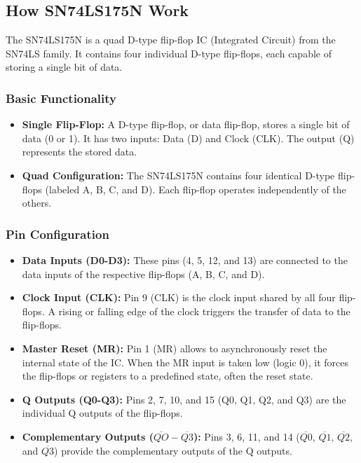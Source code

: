 \documentclass{article}
\begin{document}
\subsection{How SN74LS175N Work}
The SN74LS175N is a quad D-type flip-flop IC (Integrated Circuit) from the SN74LS family. It contains four individual D-type flip-flops, each capable of storing a single bit of data.\par

\subsubsection{Basic Functionality}\par
\begin{itemize}
    \item \textbf{Single Flip-Flop:} A D-type flip-flop, or data flip-flop, stores a single bit of data (0 or 1). It has two inputs: Data (D) and Clock (CLK). The output (Q) represents the stored data.
    \item \textbf{Quad Configuration:} The SN74LS175N contains four identical D-type flip-flops (labeled A, B, C, and D). Each flip-flop operates independently of the others.
\end{itemize}

\subsubsection{Pin Configuration}
\begin{itemize}
    \item \textbf{Data Inputs (D0-D3):} These pins (4, 5, 12, and 13) are connected to the data inputs of the respective flip-flops (A, B, C, and D).
    \item \textbf{Clock Input (CLK):} Pin 9 (CLK) is the clock input shared by all four flip-flops. A rising or falling edge of the clock triggers the transfer of data to the flip-flops.
    \item \textbf{Master Reset (MR):} Pin 1 (MR) allows to asynchronously reset the internal state of the IC. When the MR input is taken low (logic 0), it forces the flip-flops or registers to a predefined state, often the reset state.
    \item \textbf{Q Outputs (Q0-Q3):} Pins 2, 7, 10, and 15 (Q0, Q1, Q2, and Q3) are the individual Q outputs of the flip-flops.
    \item \textbf{Complementary Outputs ($\overline{QO} - \overline{Q3}$):} Pins 3, 6, 11, and 14 ($\overline{Q0}$, $\overline{Q1}$, $\overline{Q2}$, and $\overline{Q3}$) provide the complementary outputs of the Q outputs.
\end{itemize}
\end{document}
